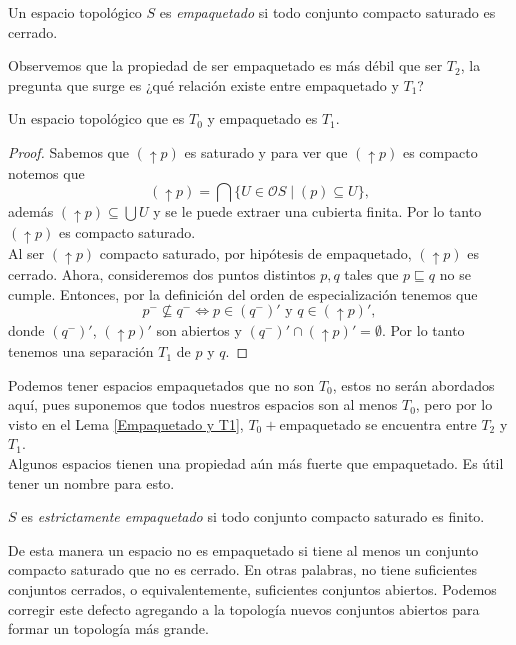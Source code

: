 \begin{dfn}\label{empaquetado}
    Un espacio topológico $S$ es \emph{empaquetado} si todo conjunto compacto saturado es cerrado. 
\end{dfn}

Observemos que la propiedad de ser empaquetado es más débil que ser $T_2$, la pregunta que surge es ¿qué relación existe entre empaquetado y $T_1$?

\begin{lem}\label{Empaquetado y T1}
    Un espacio topológico que es $T_0$ y empaquetado es $T_1$.
\end{lem}

\begin{proof}
    Sabemos que $(\uparrow p)$ es saturado y para ver que $(\uparrow p)$ es compacto notemos que 
    \[
    (\uparrow p)=\bigcap\{U\in \mathcal{O}S\mid (p)\subseteq U\},
    \]
    además $(\uparrow p)\subseteq \bigcup U$ y se le puede extraer una cubierta finita. Por lo tanto $(\uparrow p)$ es compacto saturado.\\

    Al ser $(\uparrow p)$ compacto saturado, por hipótesis de empaquetado, $(\uparrow p)$ es cerrado. Ahora, consideremos dos puntos distintos $p, q$ tales que $p\sqsubseteq q$ no se cumple. Entonces, por la definición del orden de especialización tenemos que 
    \[
    p^-\nsubseteq q^- \Leftrightarrow p\in (q^-)'\mbox{ y } q\in (\uparrow p)',
    \]
    donde $(q^-)'$, $(\uparrow p)'$ son abiertos y $(q^-)' \cap (\uparrow p)'=\emptyset$. Por lo tanto tenemos una separación $T_1$ de $p$ y $q$.
\end{proof}

Podemos tener espacios empaquetados que no son $T_0$, estos no serán abordados aquí, pues suponemos que todos nuestros espacios son al menos $T_0$, pero por lo visto en el Lema \ref{Empaquetado y T1}, $T_0+$empaquetado se encuentra entre $T_2$ y $T_1$.\\

Algunos espacios tienen una propiedad aún más fuerte que empaquetado. Es útil tener un nombre para esto.

\begin{dfn}
    $S$ es \emph{estrictamente empaquetado} si todo conjunto compacto saturado es finito. 
\end{dfn}

De esta manera un espacio no es empaquetado si tiene al menos un conjunto compacto saturado que no es cerrado. En otras palabras, no tiene suficientes conjuntos cerrados, o equivalentemente, suficientes conjuntos abiertos. Podemos corregir este defecto agregando a la topología nuevos conjuntos abiertos para formar un topología más grande. \\

